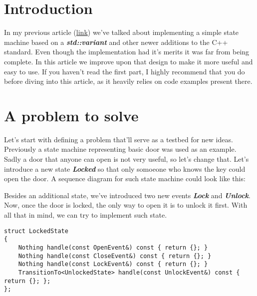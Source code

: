 \documentclass{article}[8pt]
\newcommand{\code}[1]{\textbf{\textit{#1}}}
\newcommand{\locked}{\code{Locked}}
\newcommand{\lock}{\code{Lock}}
\newcommand{\unlock}{\code{Unlock}}
\begin{document}
\section*{Introduction}
In my previous article (\href{https://sii.pl/blog/implementing-a-state-machine-in-c17/}{link}) we've talked about implementing a simple state machine based on a \code{std::variant} and other newer additions to the C++ standard.
Even though the implementation had it's merits it was far from being complete. In this article we improve upon that design to make it more useful and easy to use. If you haven't read the first part, I highly recommend that you do before diving into this article, as it heavily relies on code examples present there.

\section*{A problem to solve}

Let's start with defining a problem that'll serve as a testbed for new ideas. Previously a state machine representing basic door was used as an example. Sadly a door that anyone can open is not very useful, so let's change that. Let's introduce a new state \locked{} so that only somoeone who knows the key could open the door. A sequence diagram for such state machine could look like this:


Besides an additional state, we've introduced two new events \lock{} and \unlock{}. Now, once the door is locked, the only way to open it is to unlock it first. With all that in mind, we can try to implement such state.

\bigskip
\begin{verbatim}
struct LockedState
{
	Nothing handle(const OpenEvent&) const { return {}; }
	Nothing handle(const CloseEvent&) const { return {}; }
	Nothing handle(const LockEvent&) const { return {}; }
	TransitionTo<UnlockedState> handle(const UnlockEvent&) const { return {}; };
};
\end{verbatim}
\bigskip
\end{document}
